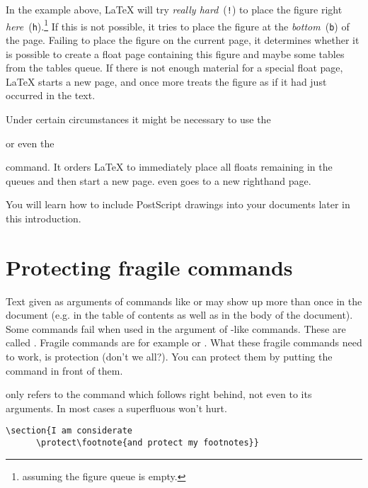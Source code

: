 \noindent In the example above, 
\LaTeX{} will try \emph{really hard}~(\texttt{!}) to place the figure
right \emph{here}~(\texttt{h}).\footnote{assuming the figure queue is
  empty.} If this is not possible, it tries to place the figure at the
\emph{bottom}~(\texttt{b}) of the page.  Failing to place the figure
on the current page, it determines whether it is possible to create a float
page containing this figure and maybe some tables from the tables
queue. If there is not enough material for a special float page,
\LaTeX{} starts a new page, and once more treats the figure as if it
had just occurred in the text.

Under certain circumstances it might be necessary to use the 

\begin{lscommand}
 or even the  
\end{lscommand}

\noindent command. It orders \LaTeX{} to immediately place all 
floats remaining in the queues and then start a new
page.  even goes to a new righthand page.

You will learn how to include PostScript
drawings into your \LaTeXe{} documents later in this introduction.

\section{Protecting fragile commands}

Text given as arguments of commands like  or  may
show up more than once in the document (e.g. in the table of contents as
well as in the body of the document). Some commands fail when used in the
argument of -like commands. These are called .
Fragile commands are for example  or . What these
fragile commands need to work, is protection (don't we all?). You can
protect them by putting the  command in front of them.

 only refers to the command which follows right behind, not even
to its arguments. In most cases a superfluous  won't hurt.

\begin{code}
\verb|\section{I am considerate|\\
\verb|      \protect\footnote{and protect my footnotes}}|
\end{code}


